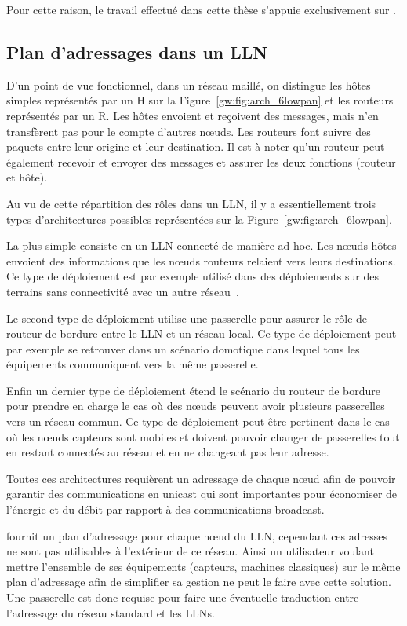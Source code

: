 Pour cette raison, le travail effectué dans cette thèse s'appuie exclusivement sur \ieee{}.

\subsection{Plan d'adressages dans un \ac{LLN}}
\label{gw:ip}

D'un point de vue fonctionnel, dans un réseau maillé, on distingue les hôtes simples représentés par un H sur la Figure~\ref{gw:fig:arch_6lowpan} et les routeurs représentés par un R.
Les hôtes envoient et reçoivent des messages, mais n'en transfèrent pas pour le compte d'autres nœuds.
Les routeurs font suivre des paquets entre leur origine et leur destination.
Il est à noter qu'un routeur peut également recevoir et envoyer des messages et assurer les deux fonctions (routeur et hôte).

Au vu de cette répartition des rôles dans un \ac{LLN}, il y a essentiellement trois types d'architectures possibles représentées sur la Figure~\ref{gw:fig:arch_6lowpan}.

La plus simple consiste en un \ac{LLN} connecté de manière ad hoc.
Les nœuds hôtes envoient des informations que les nœuds routeurs relaient vers leurs destinations.
Ce type de déploiement est par exemple utilisé dans des déploiements sur des terrains sans connectivité avec un autre réseau~\cite{werner2006deploying}.

Le second type de déploiement utilise une passerelle pour assurer le rôle de routeur de bordure entre le \ac{LLN} et un réseau local.
Ce type de déploiement peut par exemple se retrouver dans un scénario domotique dans lequel tous les équipements communiquent vers la même passerelle.

Enfin un dernier type de déploiement étend le scénario du routeur de bordure pour prendre en charge le cas où des nœuds peuvent avoir plusieurs passerelles vers un réseau commun.
Ce type de déploiement peut être pertinent dans le cas où les nœuds capteurs sont mobiles et doivent pouvoir changer de passerelles tout en restant connectés au réseau et en ne changeant pas leur adresse.

Toutes ces architectures requièrent un adressage de chaque nœud afin de pouvoir garantir des communications en unicast qui sont importantes pour économiser de l'énergie et du débit par rapport à des communications broadcast.

\ieee{} fournit un plan d'adressage pour chaque nœud du \ac{LLN}, cependant ces adresses ne sont pas utilisables à l'extérieur de ce réseau.
Ainsi un utilisateur voulant mettre l'ensemble de ses équipements (capteurs, machines classiques) sur le même plan d'adressage afin de simplifier sa gestion ne peut le faire avec cette solution.
Une passerelle est donc requise pour faire une éventuelle traduction entre l'adressage du réseau standard et les \ac{LLN}s.

